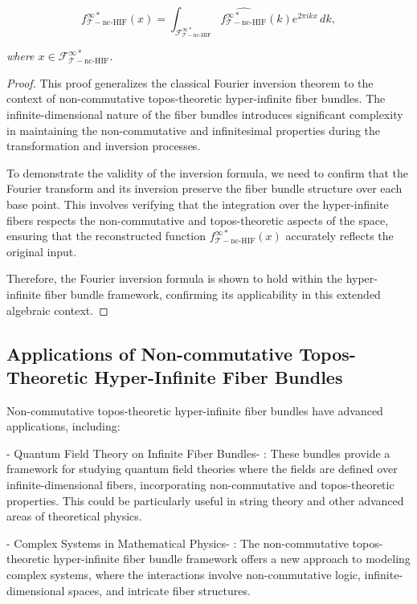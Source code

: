 \documentclass{article}
\begin{document}
\[
f_{\mathcal{T}-\text{nc-HIF}}^{\infty *}(x) = \int_{\mathcal{F}_{\mathcal{T}-\text{nc-HIF}}^{\infty *}} \widehat{f_{\mathcal{T}-\text{nc-HIF}}^{\infty *}}(k) e^{2\pi i k x} \, dk,
\]

\textit{where \(x \in \mathcal{F}_{\mathcal{T}-\text{nc-HIF}}^{\infty *}\).}

\begin{proof}
This proof generalizes the classical Fourier inversion theorem to the context of non-commutative topos-theoretic hyper-infinite fiber bundles. The infinite-dimensional nature of the fiber bundles introduces significant complexity in maintaining the non-commutative and infinitesimal properties during the transformation and inversion processes.

To demonstrate the validity of the inversion formula, we need to confirm that the Fourier transform and its inversion preserve the fiber bundle structure over each base point. This involves verifying that the integration over the hyper-infinite fibers respects the non-commutative and topos-theoretic aspects of the space, ensuring that the reconstructed function \(f_{\mathcal{T}-\text{nc-HIF}}^{\infty *}(x)\) accurately reflects the original input.

Therefore, the Fourier inversion formula is shown to hold within the hyper-infinite fiber bundle framework, confirming its applicability in this extended algebraic context.
\end{proof}

\subsection{Applications of Non-commutative Topos-Theoretic Hyper-Infinite Fiber Bundles}
Non-commutative topos-theoretic hyper-infinite fiber bundles have advanced applications, including:

-  Quantum Field Theory on Infinite Fiber Bundles- : These bundles provide a framework for studying quantum field theories where the fields are defined over infinite-dimensional fibers, incorporating non-commutative and topos-theoretic properties. This could be particularly useful in string theory and other advanced areas of theoretical physics.

-  Complex Systems in Mathematical Physics- : The non-commutative topos-theoretic hyper-infinite fiber bundle framework offers a new approach to modeling complex systems, where the interactions involve non-commutative logic, infinite-dimensional spaces, and intricate fiber structures.
\end{document}
